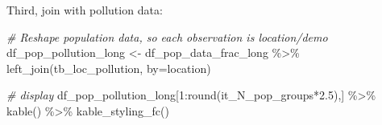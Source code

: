 \documentclass[
]{book}
\newenvironment{Shaded}{\begin{snugshade}}{\end{snugshade}}
\newcommand{\AttributeTok}[1]{\textcolor[rgb]{0.77,0.63,0.00}{#1}}
\newcommand{\CommentTok}[1]{\textcolor[rgb]{0.56,0.35,0.01}{\textit{#1}}}
\newcommand{\DecValTok}[1]{\textcolor[rgb]{0.00,0.00,0.81}{#1}}
\newcommand{\FloatTok}[1]{\textcolor[rgb]{0.00,0.00,0.81}{#1}}
\newcommand{\FunctionTok}[1]{\textcolor[rgb]{0.00,0.00,0.00}{#1}}
\newcommand{\NormalTok}[1]{#1}
\newcommand{\OtherTok}[1]{\textcolor[rgb]{0.56,0.35,0.01}{#1}}
\newcommand{\SpecialCharTok}[1]{\textcolor[rgb]{0.00,0.00,0.00}{#1}}
\newcommand{\StringTok}[1]{\textcolor[rgb]{0.31,0.60,0.02}{#1}}
\begin{document}
Third, join with pollution data:

\begin{Shaded}
\begin{Highlighting}[]
\CommentTok{\# Reshape population data, so each observation is location/demo}
\NormalTok{df\_pop\_pollution\_long }\OtherTok{\textless{}{-}}\NormalTok{ df\_pop\_data\_frac\_long }\SpecialCharTok{\%\textgreater{}\%}
  \FunctionTok{left\_join}\NormalTok{(tb\_loc\_pollution, }\AttributeTok{by=}\StringTok{\textquotesingle{}location\textquotesingle{}}\NormalTok{)}

\CommentTok{\# display}
\NormalTok{df\_pop\_pollution\_long[}\DecValTok{1}\SpecialCharTok{:}\FunctionTok{round}\NormalTok{(it\_N\_pop\_groups}\SpecialCharTok{*}\FloatTok{2.5}\NormalTok{),] }\SpecialCharTok{\%\textgreater{}\%} \FunctionTok{kable}\NormalTok{() }\SpecialCharTok{\%\textgreater{}\%} \FunctionTok{kable\_styling\_fc}\NormalTok{()}
\end{Highlighting}
\end{Shaded}
\end{document}

